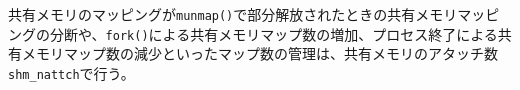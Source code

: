 \documentclass[twoside,11pt,fleqn]{book}
\begin{document}
共有メモリのマッピングが\texttt{munmap()}で部分解放されたときの共有メモリマッピングの分断や、\texttt{fork()}による共有メモリマップ数の増加、プロセス終了による共有メモリマップ数の減少といったマップ数の管理は、共有メモリのアタッチ数\texttt{shm\_nattch}で行う。
%
%
\end{document}
